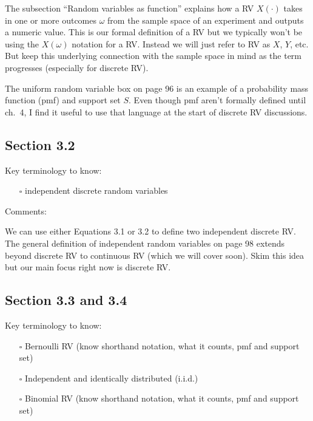 \documentclass[
  letterpaper,
]{scrbook}
\providecommand{\tightlist}{%
  \setlength{\itemsep}{0pt}\setlength{\parskip}{0pt}}\usepackage{longtable,booktabs,array}
\begin{document}
The subsection ``Random variables as function'' explains how a RV
\(X(\cdot)\) takes in one or more outcomes \(\omega\) from the sample
space of an experiment and outputs a numeric value. This is our formal
definition of a RV but we typically won't be using the \(X(\omega)\)
notation for a RV. Instead we will just refer to RV as \(X\), \(Y\),
etc. But keep this underlying connection with the sample space in mind
as the term progresses (especially for discrete RV).

The uniform random variable box on page 96 is an example of a
probability mass function (pmf) and support set \(S\). Even though pmf
aren't formally defined until ch.~4, I find it useful to use that
language at the start of discrete RV discussions.

\subsection*{Section 3.2}\label{section-3.2}

Key terminology to know:

\begin{itemize}
\tightlist
\item[$\square$]
  independent discrete random variables
\end{itemize}

Comments:

We can use either Equations 3.1 or 3.2 to define two independent
discrete RV. The general definition of independent random variables on
page 98 extends beyond discrete RV to continuous RV (which we will cover
soon). Skim this idea but our main focus right now is discrete RV.

\subsection*{Section 3.3 and 3.4}\label{section-3.3-and-3.4}

Key terminology to know:

\begin{itemize}
\tightlist
\item[$\square$]
  Bernoulli RV (know shorthand notation, what it counts, pmf and support
  set)
\item[$\square$]
  Independent and identically distributed (i.i.d.)
\item[$\square$]
  Binomial RV (know shorthand notation, what it counts, pmf and support
  set)
\end{itemize}
\end{document}
